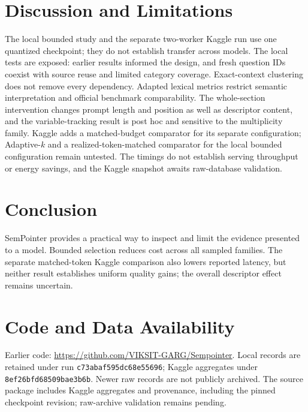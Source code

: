 \documentclass[pdflatex,sn-mathphys-num]{sn-jnl}
\begin{document}
\section{Discussion and Limitations}
The local bounded study and the separate two-worker Kaggle run use one quantized checkpoint; they do not establish transfer across models. The local tests are exposed: earlier results informed the design, and fresh question IDs coexist with source reuse and limited category coverage. Exact-context clustering does not remove every dependency. Adapted lexical metrics restrict semantic interpretation and official benchmark comparability. The whole-section intervention changes prompt length and position as well as descriptor content, and the variable-tracking result is post hoc and sensitive to the multiplicity family. Kaggle adds a matched-budget comparator for its separate configuration; Adaptive-$k$ and a realized-token-matched comparator for the local bounded configuration remain untested. The timings do not establish serving throughput or energy savings, and the Kaggle snapshot awaits raw-database validation.

\section{Conclusion}
SemPointer provides a practical way to inspect and limit the evidence presented to a model. Bounded selection reduces cost across all sampled families. The separate matched-token Kaggle comparison also lowers reported latency, but neither result establishes uniform quality gains; the overall descriptor effect remains uncertain.

\section*{Code and Data Availability}
Earlier code: \url{https://github.com/VIKSIT-GARG/Sempointer}. Local records are retained under run \texttt{c73abaf595dc68e55696}; Kaggle aggregates under \texttt{8ef26bfd68509bae3b6b}. Newer raw records are not publicly archived. The source package includes Kaggle aggregates and provenance, including the pinned checkpoint revision; raw-archive validation remains pending.
\clearpage

\end{document}
